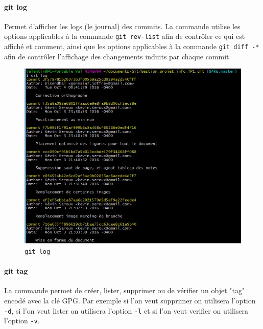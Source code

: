 \documentclass[11pt,canadien]{article}
\begin{document}
\paragraph{git log}Permet d'afficher les logs (le journal) des commits. La commande utilise les options applicables à la commande \texttt{git rev-list} afin de contrôler ce qui est affiché et comment, ainsi que les options applicables à la commande \texttt{git diff -*} afin de contrôler l'affichage des changements induits par chaque commit.
\begin{figure}[h]
	\centering
	\includegraphics[width=\textwidth]{images/git_log.png}
	\caption{\texttt{git log}}
	\label{fig:git_log}
\end{figure}

\paragraph{git tag}La commande permet de créer, lister, supprimer ou de vérifier un objet "tag" encodé avec la clé GPG. Par exemple si l'on veut supprimer on utilisera  l'option \texttt{-d}, si l'on veut lister on utilisera l'option \texttt{-l} et si l'on veut verifier on utilisera l'option \texttt{-v}.
\end{document}
